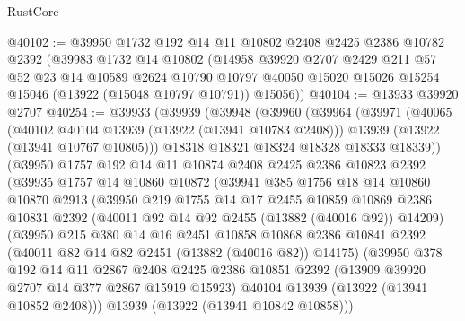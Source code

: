 \begin{lexlean}{RustCore}
\begin{coremodule}
@40102 := @39950
    @1732
    @192
    @14
    @11
    @10802
    @2408
    @2425
    @2386
    @10782
    @2392
    (@39983
      @1732
      @14
      @10802
      (@14958
        @39920
        @2707
        @2429
        @211
        @57
        @52
        @23
        @14
        @10589
        @2624
        @10790
        @10797
        @40050
        @15020
        @15026
        @15254
        @15046
        (@13922 (@15048 @10797 @10791))
        @15056))
@40104 := @13933 @39920 @2707
@40254 := @39933
    (@39939
      (@39948
        (@39960
          (@39964
            (@39971
              (@40065
                (@40102 @40104 @13939 (@13922 (@13941 @10783 @2408)))
                @13939
                (@13922 (@13941 @10767 @10805)))
              @18318
              @18321
              @18324
              @18328
              @18333
              @18339))
          (@39950
            @1757
            @192
            @14
            @11
            @10874
            @2408
            @2425
            @2386
            @10823
            @2392
            (@39935
              @1757
              @14
              @10860
              @10872
              (@39941
                @385
                @1756
                @18
                @14
                @10860
                @10870
                @2913
                (@39950
                  @219
                  @1755
                  @14
                  @17
                  @2455
                  @10859
                  @10869
                  @2386
                  @10831
                  @2392
                  (@40011 @92 @14 @92 @2455 (@13882 (@40016 @92)) @14209)
                  (@39950
                    @215
                    @380
                    @14
                    @16
                    @2451
                    @10858
                    @10868
                    @2386
                    @10841
                    @2392
                    (@40011 @82 @14 @82 @2451 (@13882 (@40016 @82)) @14175)
                    (@39950
                      @378
                      @192
                      @14
                      @11
                      @2867
                      @2408
                      @2425
                      @2386
                      @10851
                      @2392
                      (@13909 @39920 @2707 @14 @377 @2867 @15919 @15923)
                      @40104
                      @13939
                      (@13922 (@13941 @10852 @2408)))
                    @13939
                    (@13922 (@13941 @10842 @10858)))

\end{coremodule}
\end{lexlean}
